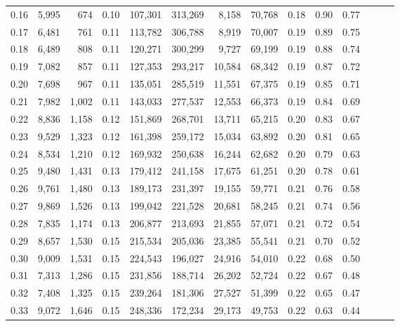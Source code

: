 \begin{tabular}{rrrrrrrrrrrrrr}
0.16 &   5,995 &    674 &  0.10 &  107,301 &  313,269 &   8,158 &  70,768 &  0.18 &  0.90 &      0.77 \\
0.17 &   6,481 &    761 &  0.11 &  113,782 &  306,788 &   8,919 &  70,007 &  0.19 &  0.89 &      0.75 \\
0.18 &   6,489 &    808 &  0.11 &  120,271 &  300,299 &   9,727 &  69,199 &  0.19 &  0.88 &      0.74 \\
0.19 &   7,082 &    857 &  0.11 &  127,353 &  293,217 &  10,584 &  68,342 &  0.19 &  0.87 &      0.72 \\
0.20 &   7,698 &    967 &  0.11 &  135,051 &  285,519 &  11,551 &  67,375 &  0.19 &  0.85 &      0.71 \\
0.21 &   7,982 &  1,002 &  0.11 &  143,033 &  277,537 &  12,553 &  66,373 &  0.19 &  0.84 &      0.69 \\
0.22 &   8,836 &  1,158 &  0.12 &  151,869 &  268,701 &  13,711 &  65,215 &  0.20 &  0.83 &      0.67 \\
0.23 &   9,529 &  1,323 &  0.12 &  161,398 &  259,172 &  15,034 &  63,892 &  0.20 &  0.81 &      0.65 \\
0.24 &   8,534 &  1,210 &  0.12 &  169,932 &  250,638 &  16,244 &  62,682 &  0.20 &  0.79 &      0.63 \\
0.25 &   9,480 &  1,431 &  0.13 &  179,412 &  241,158 &  17,675 &  61,251 &  0.20 &  0.78 &      0.61 \\
0.26 &   9,761 &  1,480 &  0.13 &  189,173 &  231,397 &  19,155 &  59,771 &  0.21 &  0.76 &      0.58 \\
0.27 &   9,869 &  1,526 &  0.13 &  199,042 &  221,528 &  20,681 &  58,245 &  0.21 &  0.74 &      0.56 \\
0.28 &   7,835 &  1,174 &  0.13 &  206,877 &  213,693 &  21,855 &  57,071 &  0.21 &  0.72 &      0.54 \\
0.29 &   8,657 &  1,530 &  0.15 &  215,534 &  205,036 &  23,385 &  55,541 &  0.21 &  0.70 &      0.52 \\
0.30 &   9,009 &  1,531 &  0.15 &  224,543 &  196,027 &  24,916 &  54,010 &  0.22 &  0.68 &      0.50 \\
0.31 &   7,313 &  1,286 &  0.15 &  231,856 &  188,714 &  26,202 &  52,724 &  0.22 &  0.67 &      0.48 \\
0.32 &   7,408 &  1,325 &  0.15 &  239,264 &  181,306 &  27,527 &  51,399 &  0.22 &  0.65 &      0.47 \\
0.33 &   9,072 &  1,646 &  0.15 &  248,336 &  172,234 &  29,173 &  49,753 &  0.22 &  0.63 &      0.44 \\

\end{tabular}
